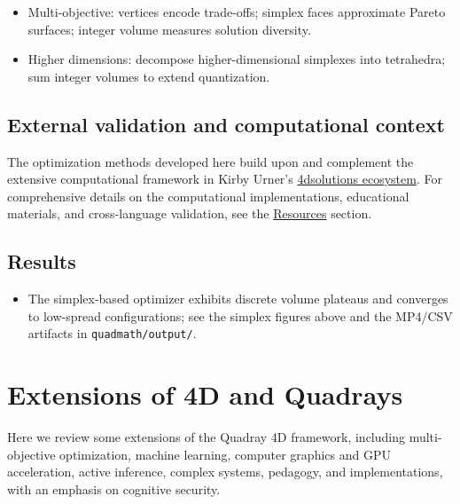 \documentclass[
  10pt,
]{article}
\newcommand{\passthrough}[1]{#1}
\providecommand{\tightlist}{%
  \setlength{\itemsep}{0pt}\setlength{\parskip}{0pt}}
\begin{document}
\begin{itemize}
\tightlist
\item
  Multi-objective: vertices encode trade-offs; simplex faces approximate
  Pareto surfaces; integer volume measures solution diversity.
\item
  Higher dimensions: decompose higher-dimensional simplexes into
  tetrahedra; sum integer volumes to extend quantization.
\end{itemize}

\hypertarget{external-validation-and-computational-context}{%
\subsection{External validation and computational
context}\label{external-validation-and-computational-context}}

The optimization methods developed here build upon and complement the
extensive computational framework in Kirby Urner's
\href{https://github.com/4dsolutions}{4dsolutions ecosystem}. For
comprehensive details on the computational implementations, educational
materials, and cross-language validation, see the
\href{07_resources.md}{Resources} section.

\hypertarget{results}{%
\subsection{Results}\label{results}}

\begin{itemize}
\tightlist
\item
  The simplex-based optimizer exhibits discrete volume plateaus and
  converges to low-spread configurations; see the simplex figures above
  and the MP4/CSV artifacts in
  \passthrough{\lstinline!quadmath/output/!}.
\end{itemize}

\newpage

\hypertarget{extensions-of-4d-and-quadrays}{%
\section{Extensions of 4D and
Quadrays}\label{extensions-of-4d-and-quadrays}}

Here we review some extensions of the Quadray 4D framework, including
multi-objective optimization, machine learning, computer graphics and
GPU acceleration, active inference, complex systems, pedagogy, and
implementations, with an emphasis on cognitive security.
\end{document}
